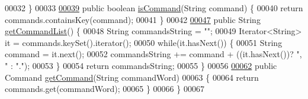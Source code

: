 \begin{DoxyCode}
00032     \}
00033 
\hypertarget{CommandWords_8java_source_l00039}{}\hyperlink{classCommandWords_a646ed94a6d8d190b7cc445378ee2306e}{00039}     \textcolor{keyword}{public} \textcolor{keywordtype}{boolean} \hyperlink{classCommandWords_a646ed94a6d8d190b7cc445378ee2306e}{isCommand}(String command) \{
00040         \textcolor{keywordflow}{return} commands.containsKey(command);
00041     \}
00042 
\hypertarget{CommandWords_8java_source_l00047}{}\hyperlink{classCommandWords_aa26f54985e39543739e0ae291dcdb8f1}{00047}     \textcolor{keyword}{public} String \hyperlink{classCommandWords_aa26f54985e39543739e0ae291dcdb8f1}{getCommandList}() \{
00048         String commandsString = \textcolor{stringliteral}{""};
00049         Iterator<String> it = commands.keySet().iterator();
00050         \textcolor{keywordflow}{while}(it.hasNext()) \{
00051             String command = it.next();
00052             commandsString += command + ((it.hasNext())? \textcolor{stringliteral}{", "} : \textcolor{stringliteral}{"."});
00053         \}
00054         \textcolor{keywordflow}{return} commandsString;
00055     \}
00056 
\hypertarget{CommandWords_8java_source_l00062}{}\hyperlink{classCommandWords_af89bc564e4cf32021721ca44f46de6cb}{00062}     \textcolor{keyword}{public} Command \hyperlink{classCommandWords_af89bc564e4cf32021721ca44f46de6cb}{getCommand}(String commandWord)
00063     \{
00064         \textcolor{keywordflow}{return} commands.get(commandWord);
00065     \}
00066 \}
00067 
\end{DoxyCode}
